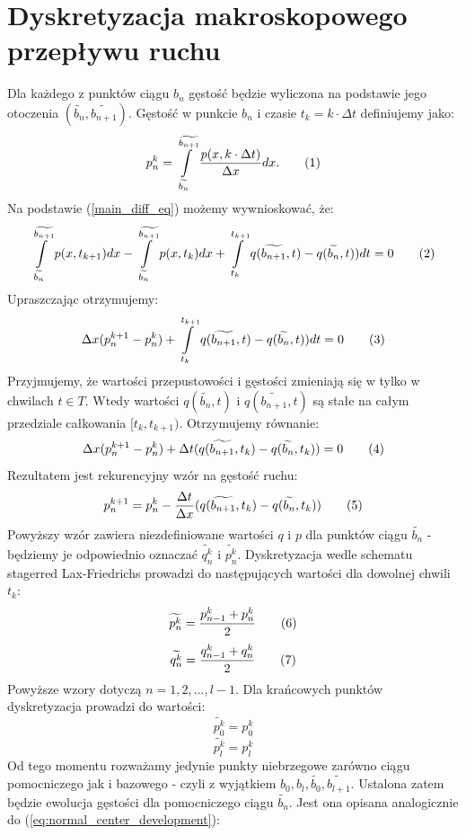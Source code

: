 \documentclass[12pt]{book}
\newcommand\addtag{\refstepcounter{equation}\tag{\theequation}}
\begin{document}
\section{Dyskretyzacja makroskopowego przepływu ruchu}\label{sec:dyskretyzacja_ruchu}



Dla każdego z punktów ciągu $b_n$ gęstość będzie wyliczona na podstawie jego otoczenia $(\widetilde{b_{n}},\widetilde{b_{n+1}})$. Gęstość w punkcie $b_n$ i czasie $t_k=k\cdot \Delta t$ definiujemy jako:
\[p_{n}^{k}=\int\limits_{{\widetilde{b_{n}}}}^{{\widetilde{b_{n+1}}}} {\frac{p(x,k \cdot \Delta t)}{\Delta x}dx}. \addtag\]
 Na podstawie (\ref{main_diff_eq}) możemy wywnioskować, że:
\[\int\limits_{\widetilde{b_{n}}}^{\widetilde{b_{n+1}}} {p(x,t_{k+1})dx-\int\limits_{\widetilde{b_{n}}}^{\widetilde{b_{n+1}}}p(x,t_{k})dx} +\int\limits_{t_k}^{t_{k+1}} q(\widetilde{b_{n+1}},t)-q(\widetilde{b_{n}},t))dt=0 \addtag \]
Upraszczając otrzymujemy:
\[\Delta x(p_n^{k+1}-p_n^{k}) +\int\limits_{t_k}^{t_{k+1}} q(\widetilde{b_{n+1}},t)-q(\widetilde{b_{n}},t))dt=0 \addtag \]
Przyjmujemy, że wartości przepustowości i gęstości zmieniają się w tylko w chwilach $t\in T$. Wtedy wartości $q(\widetilde{b_n},t)$ i $q(\widetilde{b_{n+1}},t)$ są stałe na całym przedziale całkowania $[t_k,t_{k+1})$. Otrzymujemy równanie:
\[\Delta x(p_n^{k+1}-p_n^{k})  + \Delta t (q(\widetilde{b_{n+1}},t_k)-q(\widetilde{b_{n}},t_k))=0 \addtag \]
Rezultatem jest rekurencyjny wzór na gęstość ruchu:
\[p^{k+1}_n=p^{k}_n -\frac{\Delta t}{\Delta x} (q(\widetilde{b_{n+1}},t_k)-q(\widetilde{b_{n}},t_k)) \addtag \label{eq:normal_center_development} \]  
Powyższy wzór zawiera niezdefiniowane wartości $q$ i $p$ dla punktów ciągu $\widetilde{b_n}$ - będziemy je odpowiednio oznaczać $\widetilde{q_{n}^k}$ i $\widetilde{p_{n}^k}$. Dyskretyzacja wedle schematu stagerred Lax-Friedrichs \cite{gottlich} prowadzi do następujących wartości dla dowolnej chwili $t_k$:
\[ 
\widetilde{p_n^k} =  \frac{p_{n-1}^k+p_{n}^k}{2} \addtag \label{eq:init_p_stagerred}
\]
\[ 
\widetilde{q_n^k} =  \frac{q_{n-1}^k+q_{n}^k}{2} \addtag
\]
Powyższe wzory dotyczą $n=1,2,...,l-1$. Dla krańcowych punktów dyskretyzacja prowadzi do wartości:
\[\widetilde{p^k_0}=p^k_0\]
\[\widetilde{p^k_l}=p^k_l\]
Od tego momentu rozważamy jedynie punkty niebrzegowe zarówno ciągu pomocniczego jak i bazowego - czyli z wyjątkiem $b_0,b_l,\widetilde{b_0},\widetilde{b_{l+1}}$. Ustalona zatem będzie ewolucja gęstości dla pomocniczego ciągu $\widetilde{b_n}$. Jest ona opisana analogicznie do (\ref{eq:normal_center_development}):
\end{document}
